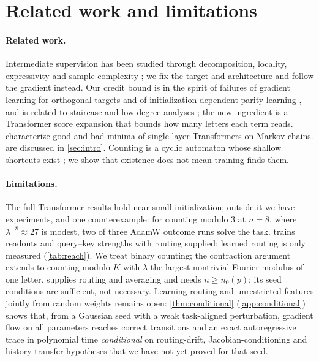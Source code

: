 \section{Related work and limitations}
\label{sec:related}
\label{sec:conclusion}

\paragraph{Related work.} Intermediate supervision has been studied through decomposition, locality,
expressivity and sample complexity
\citep{wies2023subtask,prystawski2023think,abbe2024globality,feng2023towards,merrill2024expressive,malach2023autoregressive,hanneke2026samplecomplexityautoregressivereasoning,wen2024sparse};
we fix the target and architecture and follow the gradient instead. Our credit bound is in the spirit of
failures of gradient learning for orthogonal targets \citep{shalevshwartz2017failures} and of
initialization-dependent parity learning \citep{abbe2025parities}, and is related to staircase and low-degree
analyses \citep{abbe2021staircase,abbe2023sgd,panigrahi2025progressive}; the new ingredient is a Transformer score
expansion that bounds how many letters each term reads. \citet{makkuva2025attention,makkuva2024local}
characterize good and bad minima of single-layer Transformers on Markov chains.  are
discussed in \cref{sec:intro}. Counting is a cyclic automaton whose shallow shortcuts exist
\citep{liu2023automata}; we show that existence does not mean training finds them.

\paragraph{Limitations.} The full-Transformer results hold near small initialization; outside it we have experiments,
and one counterexample: for counting modulo $3$ at $n=8$, where $\lambda^{-8}\approx27$ is modest, two of three AdamW
outcome runs solve the task.  trains readouts and query--key strengths with routing
supplied; learned routing is only measured (\cref{tab:reach}). We treat binary counting; the contraction argument extends
to counting modulo $K$ with $\lambda$ the largest nontrivial Fourier modulus of one letter.  supplies routing and averaging and needs
$n\ge n_0(p)$; its seed conditions are sufficient, not necessary. Learning routing and unrestricted features jointly from
random weights remains open: \cref{thm:conditional} (\cref{app:conditional}) shows that, from a Gaussian seed with a weak
task-aligned perturbation, gradient flow on all parameters reaches correct transitions and an exact autoregressive trace in
polynomial time \emph{conditional} on routing-drift, Jacobian-conditioning and history-transfer hypotheses that we have not
yet proved for that seed.
